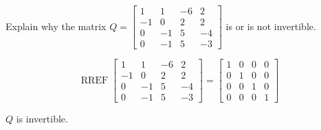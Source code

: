 
\begin{exerciseStatement}


Explain why the matrix \(Q= \left[\begin{array}{cccc}
1 & 1 & -6 & 2 \\
-1 & 0 & 2 & 2 \\
0 & -1 & 5 & -4 \\
0 & -1 & 5 & -3
\end{array}\right] \) is or is not invertible.


\end{exerciseStatement}
    
\begin{exerciseAnswer} 


\[\operatorname{RREF} \left[\begin{array}{cccc}
1 & 1 & -6 & 2 \\
-1 & 0 & 2 & 2 \\
0 & -1 & 5 & -4 \\
0 & -1 & 5 & -3
\end{array}\right] = \left[\begin{array}{cccc}
1 & 0 & 0 & 0 \\
0 & 1 & 0 & 0 \\
0 & 0 & 1 & 0 \\
0 & 0 & 0 & 1
\end{array}\right] \]

\(Q\) is invertible.
\end{exerciseAnswer}
    
